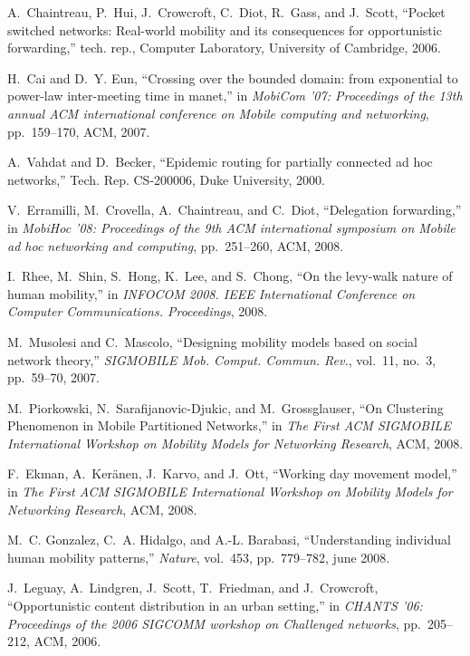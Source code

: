 \documentclass[conference]{IEEEtran}
\begin{document}
\begin{thebibliography}{10}
A.~Chaintreau, P.~Hui, J.~Crowcroft, C.~Diot, R.~Gass, and J.~Scott, ``Pocket
  switched networks: Real-world mobility and its consequences for opportunistic
  forwarding,'' tech. rep., Computer Laboratory, University of Cambridge, 2006.

H.~Cai and D.~Y. Eun, ``Crossing over the bounded domain: from exponential to
  power-law inter-meeting time in manet,'' in {\em MobiCom '07: Proceedings of
  the 13th annual ACM international conference on Mobile computing and
  networking}, pp.~159--170, ACM, 2007.

A.~Vahdat and D.~Becker, ``Epidemic routing for partially connected ad hoc
  networks,'' Tech. Rep. CS-200006, Duke University, 2000.

V.~Erramilli, M.~Crovella, A.~Chaintreau, and C.~Diot, ``Delegation
  forwarding,'' in {\em MobiHoc '08: Proceedings of the 9th ACM international
  symposium on Mobile ad hoc networking and computing}, pp.~251--260, ACM,
  2008.

I.~Rhee, M.~Shin, S.~Hong, K.~Lee, and S.~Chong, ``On the levy-walk nature of
  human mobility,'' in {\em INFOCOM 2008. IEEE International Conference on
  Computer Communications. Proceedings}, 2008.

M.~Musolesi and C.~Mascolo, ``Designing mobility models based on social network
  theory,'' {\em SIGMOBILE Mob. Comput. Commun. Rev.}, vol.~11, no.~3,
  pp.~59--70, 2007.

M.~Piorkowski, N.~Sarafijanovic-Djukic, and M.~Grossglauser, ``On {C}lustering
  {P}henomenon in {M}obile {P}artitioned {N}etworks,'' in {\em The {F}irst
  {ACM} {SIGMOBILE} {I}nternational {W}orkshop on {M}obility {M}odels for
  {N}etworking {R}esearch}, ACM, 2008.

F.~Ekman, A.~Keränen, J.~Karvo, and J.~Ott, ``Working day movement model,'' in
  {\em The {F}irst {ACM} {SIGMOBILE} {I}nternational {W}orkshop on {M}obility
  {M}odels for {N}etworking {R}esearch}, ACM, 2008.

M.~C. Gonzalez, C.~A. Hidalgo, and A.-L. Barabasi, ``Understanding individual
  human mobility patterns,'' {\em Nature}, vol.~453, pp.~779--782, june 2008.

J.~Leguay, A.~Lindgren, J.~Scott, T.~Friedman, and J.~Crowcroft,
  ``Opportunistic content distribution in an urban setting,'' in {\em CHANTS
  '06: Proceedings of the 2006 SIGCOMM workshop on Challenged networks},
  pp.~205--212, ACM, 2006.


\end{thebibliography}
\end{document}
